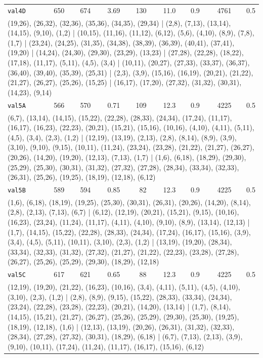 \begin{longtable}{lrrrrrrrr}
\texttt{val4D} & 650 & 674 & 3.69 & 130 & 11.0 & 0.9 & 4761 & 0.5 \\
\multicolumn{9}{p{0.96\linewidth}}{\tiny\raggedright\arraybackslash (19,26), (26,32), (32,36), (35,36), (34,35), (29,34) | (2,8), (7,13), (13,14), (14,15), (9,10), (1,2) | (10,15), (11,16), (11,12), (6,12), (5,6), (4,10), (8,9), (7,8), (1,7) | (23,24), (24,25), (31,35), (34,38), (38,39), (36,39), (40,41), (37,41), (19,20) | (14,24), (24,30), (29,30), (23,29), (13,23) | (27,28), (22,28), (18,22), (17,18), (11,17), (5,11), (4,5), (3,4) | (10,11), (20,27), (27,33), (33,37), (36,37), (36,40), (39,40), (35,39), (25,31) | (2,3), (3,9), (15,16), (16,19), (20,21), (21,22), (21,27), (26,27), (25,26), (15,25) | (16,17), (17,20), (27,32), (31,32), (30,31), (14,23), (9,14)} \\[2pt]
\texttt{val5A} & 566 & 570 & 0.71 & 109 & 12.3 & 0.9 & 4225 & 0.5 \\
\multicolumn{9}{p{0.96\linewidth}}{\tiny\raggedright\arraybackslash (6,7), (13,14), (14,15), (15,22), (22,28), (28,33), (24,34), (17,24), (11,17), (16,17), (16,23), (22,23), (20,21), (15,21), (15,16), (10,16), (4,10), (4,11), (5,11), (4,5), (3,4), (2,3), (1,2) | (12,19), (13,19), (2,13), (2,8), (8,14), (8,9), (3,9), (3,10), (9,10), (9,15), (10,11), (11,24), (23,24), (23,28), (21,22), (21,27), (26,27), (20,26), (14,20), (19,20), (12,13), (7,13), (1,7) | (1,6), (6,18), (18,29), (29,30), (25,29), (25,30), (30,31), (31,32), (27,32), (27,28), (28,34), (33,34), (32,33), (26,31), (25,26), (19,25), (18,19), (12,18), (6,12)} \\[2pt]
\texttt{val5B} & 589 & 594 & 0.85 & 82 & 12.3 & 0.9 & 4225 & 0.5 \\
\multicolumn{9}{p{0.96\linewidth}}{\tiny\raggedright\arraybackslash (1,6), (6,18), (18,19), (19,25), (25,30), (30,31), (26,31), (20,26), (14,20), (8,14), (2,8), (2,13), (7,13), (6,7) | (6,12), (12,19), (20,21), (15,21), (9,15), (10,16), (16,23), (23,24), (11,24), (11,17), (4,11), (4,10), (9,10), (8,9), (13,14), (12,13) | (1,7), (14,15), (15,22), (22,28), (28,33), (24,34), (17,24), (16,17), (15,16), (3,9), (3,4), (4,5), (5,11), (10,11), (3,10), (2,3), (1,2) | (13,19), (19,20), (28,34), (33,34), (32,33), (31,32), (27,32), (21,27), (21,22), (22,23), (23,28), (27,28), (26,27), (25,26), (25,29), (29,30), (18,29), (12,18)} \\[2pt]
\texttt{val5C} & 617 & 621 & 0.65 & 88 & 12.3 & 0.9 & 4225 & 0.5 \\
\multicolumn{9}{p{0.96\linewidth}}{\tiny\raggedright\arraybackslash (12,19), (19,20), (21,22), (16,23), (10,16), (3,4), (4,11), (5,11), (4,5), (4,10), (3,10), (2,3), (1,2) | (2,8), (8,9), (9,15), (15,22), (28,33), (33,34), (24,34), (23,24), (22,28), (23,28), (22,23), (20,21), (14,20), (13,14) | (1,7), (8,14), (14,15), (15,21), (21,27), (26,27), (25,26), (25,29), (29,30), (25,30), (19,25), (18,19), (12,18), (1,6) | (12,13), (13,19), (20,26), (26,31), (31,32), (32,33), (28,34), (27,28), (27,32), (30,31), (18,29), (6,18) | (6,7), (7,13), (2,13), (3,9), (9,10), (10,11), (17,24), (11,24), (11,17), (16,17), (15,16), (6,12)} \\[2pt]

\end{longtable}
